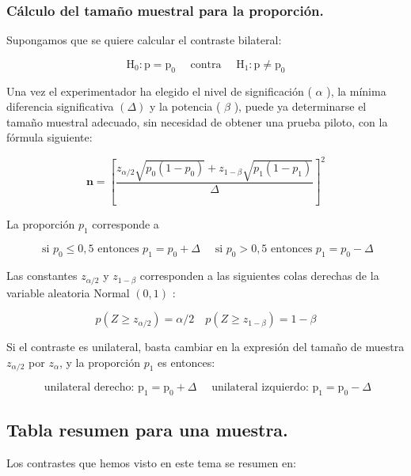\documentclass[
]{article}
\begin{document}
\subsubsection{Cálculo del tamaño muestral para la proporción.}\label{cuxe1lculo-del-tamauxf1o-muestral-para-la-proporciuxf3n.}

Supongamos que se quiere calcular el contraste bilateral:

\[
\mathrm{H}_{0}: \mathrm{p}=\mathrm{p}_{0} \quad \text { contra } \quad \mathrm{H}_{1}: \mathrm{p} \neq \mathrm{p}_{0}
\]

Una vez el experimentador ha elegido el nivel de significación ( \(\alpha\) ), la mínima diferencia significativa \((\Delta)\) y la potencia ( \(\beta\) ), puede ya determinarse el tamaño muestral adecuado, sin necesidad de obtener una prueba piloto, con la fórmula siguiente:

\[
\mathbf{n}=\left[\frac{z_{\alpha / 2} \sqrt{p_{0}\left(1-p_{0}\right)}+z_{1-\beta} \sqrt{p_{1}\left(1-p_{1}\right)}}{\Delta}\right]^{2}
\]

La proporción \(p_{1}\) corresponde a

\[
\text { si } p_{0} \leq 0,5 \text { entonces } p_{1}=p_{0}+\Delta \quad \text { si } p_{0}>0,5 \text { entonces } p_{1}=p_{0}-\Delta
\]

Las constantes \(z_{\alpha / 2}\) y \(z_{1-\beta}\) corresponden a las siguientes colas derechas de la variable aleatoria Normal \((0,1)\) :

\[
p\left(Z \geq z_{\alpha / 2}\right)=\alpha / 2 \quad p\left(Z \geq z_{1-\beta}\right)=1-\beta
\]

Si el contraste es unilateral, basta cambiar en la expresión del tamaño de muestra \(z_{\alpha / 2}\) por \(z_{\alpha}\), y la proporción \(p_{1}\) es entonces:

\[
\text { unilateral derecho: } \mathrm{p}_{1}=\mathrm{p}_{0}+\Delta \quad \text { unilateral izquierdo: } \mathrm{p}_{1}=\mathrm{p}_{0}-\Delta
\]

\subsection{Tabla resumen para una muestra.}\label{tabla-resumen-para-una-muestra.}

Los contrastes que hemos visto en este tema se resumen en:
\end{document}
